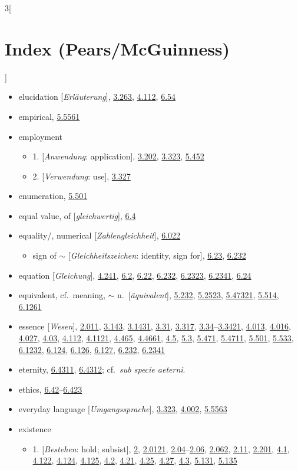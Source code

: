 \documentclass[oneside,openany,12pt]{book}
\newcommand{\indexentry}[1]{\item #1}
\newcommand{\indexsubentry}[1]{\begin{itemize} \item #1 \end{itemize}}
\newcommand{\indexref}[1]{\hyperlink{prop#1}{#1}}
\begin{document}
\begin{multicols}{3}[\section*{Index (Pears/McGuinness)}]
\begin{itemize}
\indexentry{elucidation [\textit{Erl{\"a}uterung}], \indexref{3.263}, \indexref{4.112}, \indexref{6.54}}

\indexentry{empirical, \indexref{5.5561}}

\indexentry{employment}

   \indexsubentry{1. [\textit{Anwendung}: application], \indexref{3.202}, \indexref{3.323}, \indexref{5.452}}

   \indexsubentry{2. [\textit{Verwendung}: use], \indexref{3.327}}

\indexentry{enumeration, \indexref{5.501}}

\indexentry{equal value, of [\textit{gleichwertig}], \indexref{6.4}}

\indexentry{equality/, numerical [\textit{Zahlengleichheit}], \indexref{6.022}}

   \indexsubentry{sign of $\sim$ [\textit{Gleichheitszeichen}: identity, sign for], \indexref{6.23}, \indexref{6.232}}

\indexentry{equation [\textit{Gleichung}], \indexref{4.241}, \indexref{6.2}, \indexref{6.22}, \indexref{6.232}, \indexref{6.2323}, \indexref{6.2341}, \indexref{6.24}}

\indexentry{equivalent, cf.\ meaning, $\sim$ n.\ [\textit{{\"a}quivalent}], \indexref{5.232}, \indexref{5.2523}, \indexref{5.47321}, \indexref{5.514}, \indexref{6.1261}}

\indexentry{essence [\textit{Wesen}], \indexref{2.011}, \indexref{3.143}, \indexref{3.1431}, \indexref{3.31}, \indexref{3.317}, \indexref{3.34}--\indexref{3.3421}, \indexref{4.013}, \indexref{4.016}, \indexref{4.027}, \indexref{4.03}, \indexref{4.112}, \indexref{4.1121}, \indexref{4.465}, \indexref{4.4661}, \indexref{4.5}, \indexref{5.3}, \indexref{5.471}, \indexref{5.4711}, \indexref{5.501}, \indexref{5.533}, \indexref{6.1232}, \indexref{6.124}, \indexref{6.126}, \indexref{6.127}, \indexref{6.232}, \indexref{6.2341}}

\indexentry{eternity, \indexref{6.4311}, \indexref{6.4312}; cf.\ \textit{sub specie aeterni}.}

\indexentry{ethics, \indexref{6.42}--\indexref{6.423}}

\indexentry{everyday language [\textit{Umgangssprache}], \indexref{3.323}, \indexref{4.002}, \indexref{5.5563}}

\indexentry{existence}

   \indexsubentry{1. [\textit{Bestehen}: hold; subsist], \indexref{2}, \indexref{2.0121}, \indexref{2.04}--\indexref{2.06}, \indexref{2.062}, \indexref{2.11}, \indexref{2.201}, \indexref{4.1}, \indexref{4.122}, \indexref{4.124}, \indexref{4.125}, \indexref{4.2}, \indexref{4.21}, \indexref{4.25}, \indexref{4.27}, \indexref{4.3}, \indexref{5.131}, \indexref{5.135}}


\end{itemize}
\end{multicols}
\end{document}
